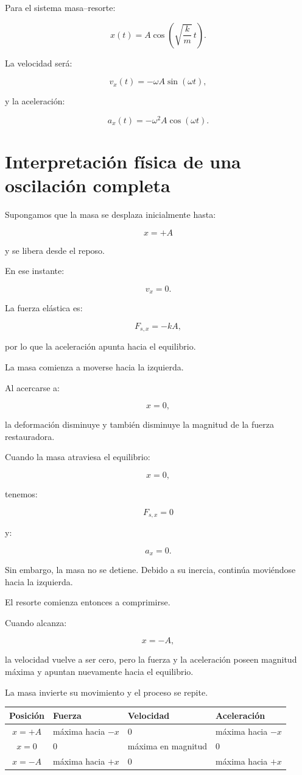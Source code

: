 Para el sistema masa--resorte:

\[ \boxed{x(t)=A\cos\left(\sqrt{\frac{k}{m}}\,t\right)}. \]

La velocidad será:

\[ \boxed{v_x(t)=-\omega A\sin(\omega t)}, \]

y la aceleración:

\[ \boxed{a_x(t)=-\omega^2A\cos(\omega t)}. \]


\section{Interpretación física de una oscilación completa}

Supongamos que la masa se desplaza inicialmente hasta:

\[ x=+A \]

y se libera desde el reposo.

En ese instante:

\[ v_x=0. \]

La fuerza elástica es:

\[ F_{s,x}=-kA, \]

por lo que la aceleración apunta hacia el equilibrio.

La masa comienza a moverse hacia la izquierda.

Al acercarse a:

\[ x=0, \]

la deformación disminuye y también disminuye la magnitud de la fuerza restauradora.

Cuando la masa atraviesa el equilibrio:

\[ x=0, \]

tenemos:

\[ F_{s,x}=0 \]

y:

\[ a_x=0. \]

Sin embargo, la masa no se detiene. Debido a su inercia, continúa moviéndose hacia la izquierda.

El resorte comienza entonces a comprimirse.

Cuando alcanza:

\[ x=-A, \]

la velocidad vuelve a ser cero, pero la fuerza y la aceleración poseen magnitud máxima y apuntan nuevamente hacia el equilibrio.

La masa invierte su movimiento y el proceso se repite.

\begin{center}
\begin{tabularx}{0.94\textwidth}{cYYY}
\toprule
\textbf{Posición} & \textbf{Fuerza} & \textbf{Velocidad} & \textbf{Aceleración} \\
\midrule
\(x=+A\) & máxima hacia \(-x\) & \(0\) & máxima hacia \(-x\) \\
\(x=0\) & \(0\) & máxima en magnitud & \(0\) \\
\(x=-A\) & máxima hacia \(+x\) & \(0\) & máxima hacia \(+x\) \\
\bottomrule
\end{tabularx}
\end{center}

